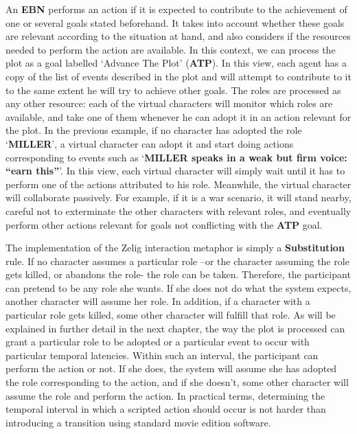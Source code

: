 \documentclass[
		twoside,openright,titlepage,numbers=noenddot,manychapters,
		headinclude,%
                footinclude=false,cleardoublepage=empty,
                BCOR=5mm,
		fontsize=11pt, %
                 enabledeprecatedfontcommands]{scrreprt}
\begin{document}
An \textbf{EBN} performs an action if it is expected to contribute to the achievement of one or several goals stated beforehand. It takes into account whether these goals are relevant according to the situation at hand, and also considers if the resources needed to perform the action are available. In this context, we can process the plot as a goal labelled ‘Advance The Plot’ (\textbf{ATP}). In this view, each agent has a copy of the list of events described in the plot and will attempt to contribute to it to the same extent he will try to achieve other goals. The roles are processed as any other resource: each of the virtual characters will monitor which roles are available, and take one of them whenever he can adopt it in an action relevant for the plot. In the previous example, if no character has adopted the role ‘\textbf{MILLER}’, a virtual character can adopt it and start doing actions corresponding to events such as ‘\textbf{MILLER speaks in a weak but firm voice: “earn this”}’. In this view, each virtual character will simply wait until it has to perform one of the actions attributed to his role. Meanwhile, the virtual character will collaborate passively. For example, if it is a war scenario, it will stand nearby, careful not to exterminate the other characters with relevant roles, and eventually perform other actions relevant for goals not conflicting with the \textbf{ATP} goal.

The implementation of the Zelig interaction metaphor is simply a \textbf{Substitution} rule. If no character assumes a particular role –or the character assuming the role gets killed, or abandons the role- the role can be taken. Therefore, the participant can pretend to be any role she wants. If she does not do what the system expects, another character will assume her role. In addition, if a character with a particular role gets killed, some other character will fulfill that role.  As will be explained in further detail in the next chapter, the way the plot is processed can grant a particular role to be adopted or a particular event to occur with particular temporal latencies. Within such an interval, the participant can perform the action or not. If she does, the system will assume she has adopted the role corresponding to the action, and if she doesn’t, some other character will assume the role and perform the action. In practical terms, determining the temporal interval in which a scripted action should occur is not harder than introducing a transition using standard movie edition software.
\end{document}
